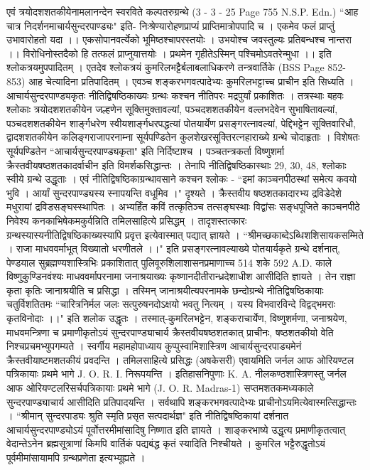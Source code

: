 एवं त्रयोदशशतकीयेनामलानन्देन स्वरविते कल्पतरुग्रन्थे (3 - 3 - 25 Page 755 N.S.P. Edn.) ``आह चात्र निदर्शनमाचार्यसुन्दरपाण्ड्यः" इति-
निःश्रेण्यारोहणप्राप्यं प्राप्तिमात्रोपपादि च ।
एकमेव फलं प्राप्तुं उभावारोहतो यदा ।।
एकसोपानवर्त्येको भूमिष्ठश्चापरस्तयोः ।
उभयोश्च जवस्तुल्यः प्रतिबन्धश्च नान्तरा ।।
विरोधिनोस्तदैको हि तत्फलं प्राप्नुयात्तयोः ।
प्रथमेन गृहीतेऽस्मिन् पश्चिमोऽवतरेन्मुधा ।। इति 
श्लोकत्रयमुपपादितम् । एतदेव श्लोकत्रयं कुमरिलभट्टैर्बलाबलाधिकरणे तन्त्रवार्तिके (BSS Page 852-853) आह चेत्यादिना प्रतिपादितम् । एवञ्च शङ्करभगवत्पादेभ्यः कुमरिलभट्टाच्च प्राचीन इति सिध्यति ।
आचार्यसुन्दरपाण्ड्यकृतः नीतिद्विषष्ठिकाख्यः ग्रन्थः कश्चन नीतिपरः मद्रपुर्यां प्रकाशितः । तत्रस्थाः बहवः श्लोकाः त्रयोदशशतकीयेन जल्हणेन सूक्तिमुक्तावल्यां, पञ्चदशशतकीयेन वल्लभदेवेन सुभाषितावल्यां, पञ्चदशशतकीयेन शार्ङ्गधरेण स्वीयशार्ङ्गधरपद्धत्यां पोतयार्येण प्रसङ्गरत्नावल्यां, पेद्दिभट्टेन सूक्तिवारिधौ, द्वादशशतकीयेन कलिङ्गराजापरनाम्ना सूर्यपण्डितेन कुलशेखरसूक्तिरत्नहाराख्ये ग्रन्थे चोदाहृताः । विशेषतः सूर्यपण्डितेन ``आचार्यसुन्दरपाण्ड्यकृता" इति निर्दिष्टाश्च । पञ्चतन्त्रकर्ता विष्णुशर्मा क्रैस्तवीयषष्ठशतकादर्वाचीन इति विमर्शकसिद्धान्तः । तेनापि नीतिद्विषष्ठिकास्थाः 29, 30, 48, श्लोकाः स्वीये ग्रन्थे उद्धृताः । एवं नीतिद्विषष्ठिकाग्रन्थावसाने कश्चन श्लोकः - ``इमां काञ्चनपीठस्थां समेत्य कवयो भुवि । आर्यां सुन्दरपाण्ड्यस्य स्नापयन्ति वधूमिव ।" दृश्यते । क्रैस्तवीय षष्ठशतकादारभ्य द्रविडेदेशे मधुरायां द्रविडसङ्घस्स्थापितः । अभ्यर्हिंत कविं तत्कृतिञ्च तत्सङ्घस्थाः विद्वांसः सङ्धपूजिते काञ्चनपीठे निवेश्य कनकाभिषेकमकुर्वन्निति तमिलसाहित्ये प्रसिद्धम् । तादृशस्तत्कारः ग्रन्थस्यास्यनीतिद्विषष्ठिकाख्यस्यापि प्रवृत्त इत्येवास्मात् पद्यात् ज्ञायते ।
``श्रीमच्छकाब्देऽब्धिशशिसायकसम्मिते । राजा माधववर्माभूत् विख्यातो धरणीतले ।।" इति प्रसङ्गरत्नावल्याख्ये पोतयार्यकृते ग्रन्थे दर्शनात्, पेण्डयाल सुब्रह्मण्यशास्त्रिभिः प्रकाशितात् पुलिवूरुशिलाशासनप्रमाणाच्च 514 शके 592 A.D. काले विष्णुकुण्डिनवंश्यः माधववर्मापरनामा जनाश्रयाख्यः कृष्णानदीतीरान्ध्रदेशाधीश आसीदिति ज्ञायते । तेन राज्ञा कृता कृतिः जानाश्रयीति च प्रसिद्धा । तस्मिन् जानाश्रयीत्यपरनामके छन्दोग्रन्थे नीतिद्विषष्ठिकायाः चतुर्विशतितमः ``चारित्रनिर्मल जलः सत्पुरुषनदोऽक्षयो भवतु नित्यम् । यस्य विभवारविन्दे विद्वद्भमराः कृतविनोदाः ।।" इति शलोक उद्धृतः ।
तस्मात्-कुमरिलभट्टेन, शङ्कराचार्येण, विष्णुशर्मणा, जनाश्रयेण, माधवमन्त्रिणा च प्रमाणीकृतोऽयं सुन्दरपाण्ड्याचार्य क्रैस्तवीयषष्ठशतकात् प्राचीनः, षष्ठशतकीयो वेति निश्चप्रचमभ्युपगम्यते ।
स्वर्गीय महामहोपाध्याय कुप्पुस्वामिशास्त्रिण आचार्यसुन्दरपाड्यमेनं क्रैस्तवीयाष्टमशतकीयं प्रवदन्ति । तमिलसाहित्ये प्रसिद्धः (अषकेसरी) एवायमिति जर्नल आफ ओरियण्टल पत्रिकायाः प्रथमे भागे J. O. R. I. निरूपयन्ति । इतिहासनिपुणाः K. A. नीलकण्ठशास्त्रिणस्तु जर्नल आफ ओरियण्टलरिसर्चपत्रिकायाः प्रथमे भागे (J. O. R. Madras-1) सप्तमशतकमध्यकाले सुन्दरपाण्ड्याचार्य आसीदिति प्रतिपादयन्ति । सर्वथापि शङ्करभगवत्पादेभ्यः प्राचीनोऽयमित्येवास्मत्सिद्धान्तः । ``श्रीमान् सुन्दरपाड्यः श्रुति स्मृति प्रसृत सत्पदार्थज्ञ" इति नीतिद्विषष्ठिकायां दर्शनात आचार्यसुन्दरपाण्ड्योऽयं पूर्वोत्तरमीमांसादिषु निष्णात इति ज्ञायते । शाङ्करभाष्ये उद्धृत्य प्रमाणीकृतत्वात् वेदान्तेऽनेन ब्रह्मसूत्राणां किमपि वार्तिकं पद्यबंद्ध कृतं स्यादिति निश्चीयते । कुमरिल भट्टैरुद्धृतोऽयं पूर्वमीमांसायामपि ग्रन्थप्रणेता इत्यभ्यूह्यते ।
